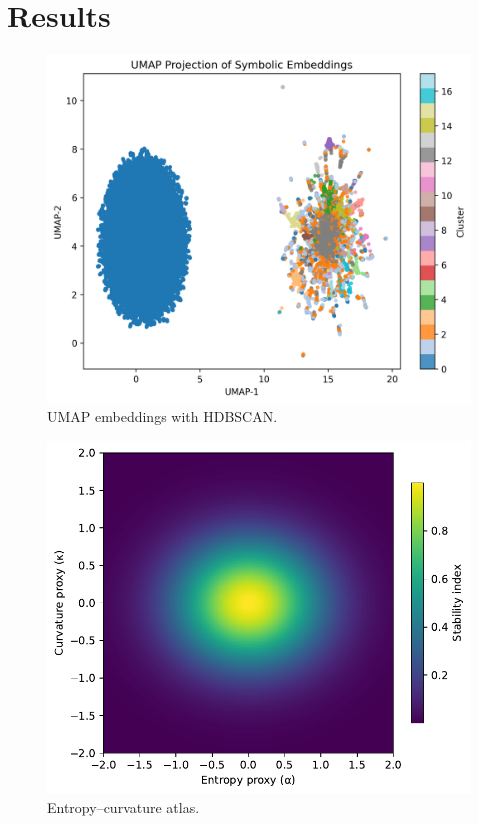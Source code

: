 \documentclass[fleqn,10pt]{wlscirep}
\begin{document}
\section*{Results}
\begin{figure}[H]\centering\includegraphics[width=\linewidth]{umap_projection.png}\caption{UMAP embeddings with HDBSCAN.}\end{figure}
\begin{figure}[H]\centering\includegraphics[width=\linewidth]{Fig_symbolic_heatmap.pdf}\caption{Entropy--curvature atlas.}\end{figure}
\end{document}
